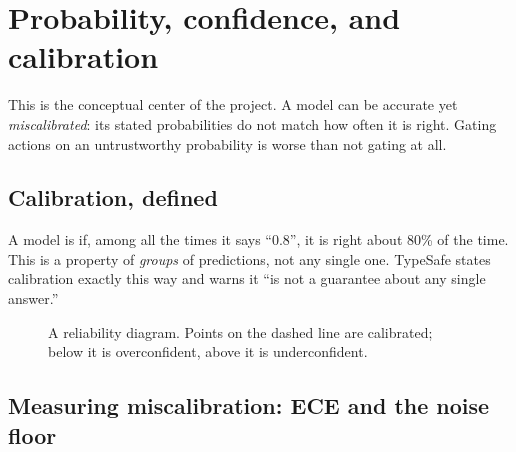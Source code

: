\chapter{Probability, confidence, and calibration}
\label{ch:calibration}

This is the conceptual center of the project. A model can be accurate yet
\emph{miscalibrated}: its stated probabilities do not match how often it is right. Gating
actions on an untrustworthy probability is worse than not gating at all.

\section{Calibration, defined}

A model is  if, among all the times it says ``0.8'', it is right about
80\% of the time. This is a property of \emph{groups} of predictions, not any single one.
TypeSafe states calibration exactly this way and warns it ``is not a guarantee about any
single answer.''\DOC{}

\begin{figure}[h]\centering
{}
\caption{A reliability diagram. Points on the dashed line are calibrated; below it is
overconfident, above it is underconfident.}
\label{fig:reliability}
\end{figure}

\section{Measuring miscalibration: ECE and the noise floor}

